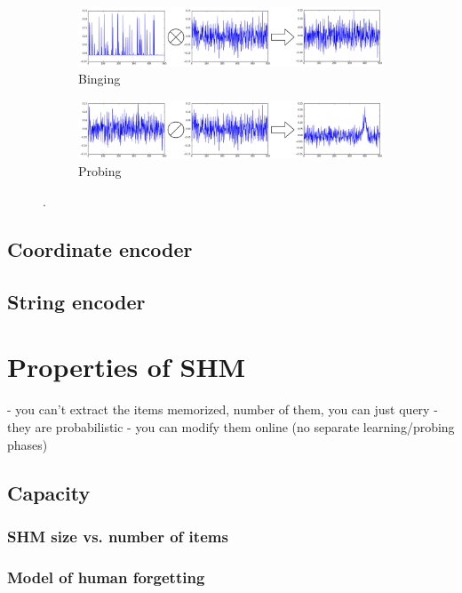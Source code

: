 \documentclass[conference]{IEEEtran}
\begin{document}
\begin{figure}
\begin{subfigure}{1\columnwidth}
\includegraphics[width=\columnwidth]{img/scalar-post-perm.png}
\caption{Binging}
\label{perm-a}
\end{subfigure}
\begin{subfigure}{1\columnwidth}
\includegraphics[width=\columnwidth]{img/scalar-post-perm-probe.png}
\caption{Probing}
\label{perm-b}
\end{subfigure}
\caption{.}
\label{perm}
\end{figure}



\subsection{Coordinate encoder}

\subsection{String encoder}

\section{Properties of SHM}

- you can't extract the items memorized, number of them, you can just query
- they are probabilistic
- you can modify them online (no separate learning/probing phases)
\subsection{Capacity}
\subsubsection{SHM size vs. number of items}
\subsubsection{Model of human forgetting}
\end{document}
